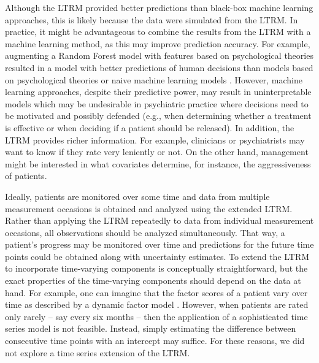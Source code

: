 \documentclass[a4paper,usenames,dvipsnames]{article}
\newenvironment{revision}{\color{teal}}{\color{black}}
\begin{document}
Although the LTRM provided better predictions than black-box machine learning approaches, this is likely because the data were simulated from the LTRM. 
\begin{revision}%
In practice, it might be advantageous to combine the results from the LTRM with a machine learning method, as this may improve prediction accuracy. 
For example, augmenting a Random Forest model with features based on psychological theories resulted in a model with better predictions of human decisions than models based on psychological theories or naive machine learning models \cite{plonsky2019predicting, plonsky2017psychological}.%
\end{revision}
However, machine learning approaches, despite their predictive power, may result in uninterpretable models which may be undesirable in psychiatric practice where decisions need to be motivated and possibly defended (e.g., when determining whether a treatment is effective or when deciding if a patient should be released). \begin{revision}In addition, the LTRM provides richer information. For example, clinicians or psychiatrists may want to know if they rate very leniently or not. On the other hand, management might be interested in what covariates determine, for instance, the aggressiveness of patients.\end{revision}

Ideally, patients are monitored over some time and data from multiple measurement occasions is obtained and analyzed using the extended LTRM. Rather than applying the LTRM repeatedly to data from individual measurement occasions, all observations should be analyzed simultaneously. That way, a patient's progress may be monitored over time and predictions for the future time points could be obtained along with uncertainty estimates. To extend the LTRM to incorporate time-varying components is conceptually straightforward, but the exact properties of the time-varying components should depend on the data at hand. For example, one can imagine that the factor scores of a patient vary over time as described by a dynamic factor model \cite{molenaar1985dynamic, forni2000generalized}. However, when patients are rated only rarely -- say every six months -- then the application of a sophisticated time series model is not feasible. Instead, simply estimating the difference between consecutive time points with an intercept may suffice. For these reasons, we did not explore a time series extension of the LTRM.
\end{document}
